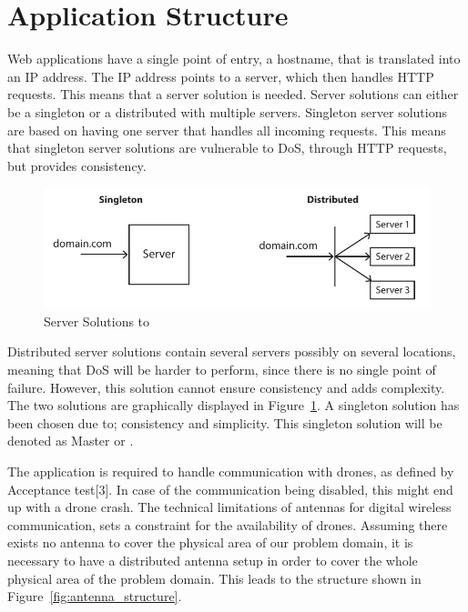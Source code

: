 \section{Application Structure}
\label{sec:application_structure}

Web applications have a single point of entry, a hostname, that is translated into an IP address. The IP address points to a server, which then handles HTTP requests. This means that a server solution is needed. Server solutions can either be a singleton or a distributed with multiple servers. Singleton server solutions are based on having one server that handles all incoming requests. This means that singleton server solutions are vulnerable to DoS, through HTTP requests, but provides consistency.

\begin{figure}[htb]
    \centering
    \includegraphics[width=\textwidth]{gfx/server_solutions.pdf}
    \caption{Server Solutions to \projectname{}}
    \label{fig:server_solutions}
\end{figure}

Distributed server solutions contain several servers possibly on several locations, meaning that DoS will be harder to perform, since there is no single point of failure. However, this solution cannot ensure consistency and adds complexity. The two solutions are graphically displayed in Figure~\ref{fig:server_solutions}. A singleton solution has been chosen due to; consistency and simplicity. This singleton solution will be denoted as Master or .

The application is required to handle communication with drones, as defined by Acceptance test[3]. In case of the communication being disabled, this might end up with a drone crash. The technical limitations of antennas for digital wireless communication, sets a constraint for the availability of drones. Assuming there exists no antenna to cover the physical area of our problem domain, it is necessary to have a distributed antenna setup in order to cover the whole physical area of the problem domain. This leads to the structure shown in Figure~\ref{fig:antenna_structure}.


